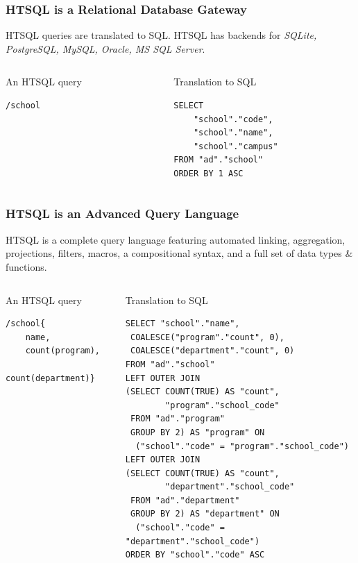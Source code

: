 \documentclass{beamer}
\begin{document}
\begin{frame}[containsverbatim]
\frametitle{HTSQL is a Relational Database Gateway}
HTSQL queries are translated to SQL.  HTSQL has backends for
\emph{SQLite, PostgreSQL, MySQL, Oracle, MS SQL Server}.
\begin{columns}[c]
\begin{column}[T]{.5\textwidth}
\begin{block}{An HTSQL query}
\begin{lstlisting}
/school
\end{lstlisting}
\end{block}
\end{column}
\begin{column}[T]{.5\textwidth}
\begin{block}{Translation to SQL}
\begin{lstlisting}
SELECT
    "school"."code",
    "school"."name",
    "school"."campus"
FROM "ad"."school"
ORDER BY 1 ASC
\end{lstlisting}
\end{block}
\end{column}
\end{columns}
\end{frame}

\begin{frame}[containsverbatim]
\frametitle{HTSQL is an Advanced Query Language}
HTSQL is a complete query language featuring automated linking, aggregation,
projections, filters, macros, a compositional syntax, and a full set of data
types \& functions.
\begin{columns}[c]
\begin{column}[T]{.5\textwidth}
\begin{block}{An HTSQL query}
\begin{lstlisting}
/school{
    name,
    count(program),
    count(department)}
\end{lstlisting}
\end{block}
\end{column}
\begin{column}[T]{.5\textwidth}
\begin{block}{Translation to SQL}
\fontsize{1}{1}
\begin{lstlisting}
SELECT "school"."name",
 COALESCE("program"."count", 0),
 COALESCE("department"."count", 0)
FROM "ad"."school"
LEFT OUTER JOIN
(SELECT COUNT(TRUE) AS "count",
        "program"."school_code"
 FROM "ad"."program"
 GROUP BY 2) AS "program" ON
  ("school"."code" = "program"."school_code")
LEFT OUTER JOIN
(SELECT COUNT(TRUE) AS "count",
        "department"."school_code"
 FROM "ad"."department"
 GROUP BY 2) AS "department" ON
  ("school"."code" = "department"."school_code")
ORDER BY "school"."code" ASC
\end{lstlisting}
\end{block}
\end{column}
\end{columns}
\end{frame}
\end{document}
